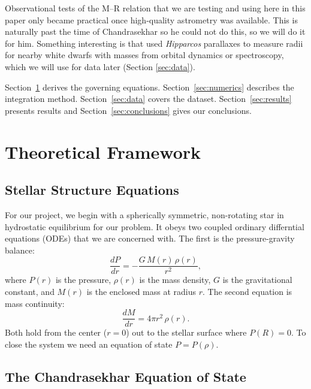 \documentclass[12pt,letterpaper]{article}
\begin{document}
Observational tests of the M--R relation that we are testing and using here in this paper only became practical once high-quality
astrometry was available. This is naturally past the time of Chandrasekhar so he could not do this, so we will do it for him.
Something interesting is that \citet{provencal1998} used \textit{Hipparcos} parallaxes to measure radii for
nearby white dwarfs with masses from orbital dynamics or spectroscopy, which we will use for data later (Section \ref{sec:data}).

Section~\ref{sec:theory} derives the governing equations.
Section~\ref{sec:numerics} describes the integration method.
Section~\ref{sec:data} covers the dataset.
Section~\ref{sec:results} presents results and
Section~\ref{sec:conclusions} gives our conclusions.

\section{Theoretical Framework}
\label{sec:theory}

\subsection{Stellar Structure Equations}

For our project, we begin with a spherically symmetric, non-rotating star in hydrostatic equilibrium for our problem. It obeys
two coupled ordinary differntial equations (ODEs) that we are concerned with.
The first is the pressure-gravity balance:
\begin{equation}
  \frac{dP}{dr} = -\frac{G\,M(r)\,\rho(r)}{r^2},
  \label{eq:hse}
\end{equation}
where $P(r)$ is the pressure, $\rho(r)$ is the mass density, $G$ is the gravitational
constant, and $M(r)$ is the enclosed mass at radius $r$.
The second equation is mass continuity:
\begin{equation}
  \frac{dM}{dr} = 4\pi r^2\,\rho(r).
  \label{eq:mass}
\end{equation}
Both hold from the center ($r = 0$) out to the stellar surface where $P(R) = 0$.
To close the system we need an equation of state $P = P(\rho)$.

\subsection{The Chandrasekhar Equation of State}
\label{sec:eos}
\end{document}

